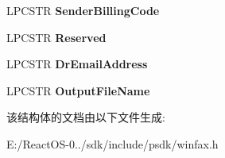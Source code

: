 \begin{DoxyCompactItemize}
\mbox{\label{struct___f_a_x___p_r_i_n_t___i_n_f_o_a_a70a247087be4db5e0817483705832268}} 
L\+P\+C\+S\+TR {\bfseries Sender\+Billing\+Code}
\item 
\mbox{\label{struct___f_a_x___p_r_i_n_t___i_n_f_o_a_a7725c986bab43395949f16126bf04106}} 
L\+P\+C\+S\+TR {\bfseries Reserved}
\item 
\mbox{\label{struct___f_a_x___p_r_i_n_t___i_n_f_o_a_a445a113486fdf27e04d7f88bdd3a540b}} 
L\+P\+C\+S\+TR {\bfseries Dr\+Email\+Address}
\item 
\mbox{\label{struct___f_a_x___p_r_i_n_t___i_n_f_o_a_aadd567a0a7c12d3611d6cb80012fed4e}} 
L\+P\+C\+S\+TR {\bfseries Output\+File\+Name}
\end{DoxyCompactItemize}


该结构体的文档由以下文件生成\+:\begin{DoxyCompactItemize}
\item 
E\+:/\+React\+O\+S-\/0../sdk/include/psdk/winfax.\+h\end{DoxyCompactItemize}
